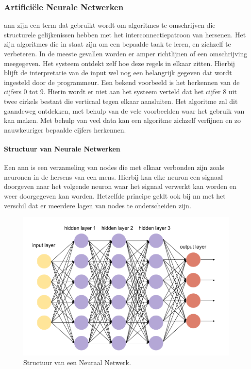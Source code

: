 		\subsubsection{Artifici\"ele Neurale Netwerken}
		\gls{ann} zijn een term dat gebruikt wordt om algoritmes te omschrijven die structurele gelijkenissen hebben met het interconnectiepatroon van hersenen. Het zijn algoritmes die in staat zijn om een bepaalde taak te leren, en zichzelf te verbeteren. In de meeste gevallen worden er amper richtlijnen of een omschrijving meegegeven. Het systeem ontdekt zelf hoe deze regels in elkaar zitten\cite{carbonell1983overviewd}. Hierbij blijft de interpretatie van de input wel nog een belangrijk gegeven dat wordt ingesteld door de programmeur. Een bekend voorbeeld is het herkennen van de cijfers 0 tot 9. Hierin wordt er niet aan het systeem verteld dat het cijfer 8 uit twee cirkels bestaat die verticaal tegen elkaar aansluiten. Het algoritme zal dit gaandeweg ontdekken, met behulp van de vele voorbeelden waar het gebruik van kan maken. Met behulp van veel data kan een algoritme zichzelf verfijnen en zo nauwkeuriger bepaalde cijfers herkennen.
		
			\paragraph{Structuur van Neurale Netwerken}
			Een \gls{ann} is een verzameling van nodes die met elkaar verbonden zijn zoals neuronen in de hersens van een mens. Hierbij kan elke neuron een signaal doorgeven naar het volgende neuron waar het signaal verwerkt kan worden en weer doorgegeven kan worden. Hetzelfde principe geldt ook bij \gls{nn} met het verschil dat er meerdere lagen van nodes te onderscheiden zijn. 
	
		\begin{figure}
			\centering
			\includegraphics[width=140mm]{afbeeldingen/neuralNetwork3.PNG}
			\caption{Structuur van een Neuraal Netwerk\cite{bron:machinelearningnetwork3}.}
			\label{fig:neuralNetworkStructuur}
		\end{figure}
		
